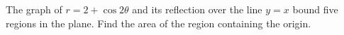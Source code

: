 The graph of $r=2+\cos2\theta$ and its reflection over the line $y=x$ bound five regions in the plane. Find the area of the region containing the origin.